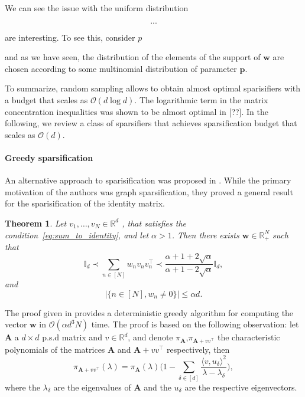 \documentclass[twoside,11pt]{book}
\newtheorem{theorem}{Theorem}
\numberwithin{theorem}{chapter}
\numberwithin{definition}{chapter}
\numberwithin{proposition}{chapter}
\numberwithin{corollary}{chapter}
\numberwithin{example}{chapter}
\numberwithin{lemma}{chapter}
\DeclareMathOperator{\Tran}{\intercal}
\begin{document}
We can see the issue with the uniform distribution 

\begin{equation}
...
\end{equation}

are interesting. To see this, consider $p$

 and as we have seen, the distribution of the elements of the support of $\bm{w}$ are chosen according to some multinomial distribution of parameter $\bm{p}$.

To summarize, random sampling allows to obtain almost optimal sparisifiers with a budget that scales as $\mathcal{O}(d \log d)$. The logarithmic term in the matrix concentration inequalities was shown to be almost optimal in [??]. 
In the following, we review a class of sparsifiers that achieves sparsification budget that scales as $\mathcal{O}(d)$.

\paragraph{Greedy sparsification}
An alternative approach to sparisification was proposed in \citep*{BaSpSr12}. While the primary motivation of the authors was graph sparsification, they proved a general result for the sparisification of the identity matrix.
\begin{theorem}\citep*{BaSpSr12}
Let $v_{1}, \dots, v_{N} \in \mathbb{R}^{d}$ , that satisfies the condition~\eqref{eq:sum_to_identity}, and let $\alpha >1$. Then there exists $\bm{w} \in \mathbb{R}_{+}^{N}$ such that
\begin{equation}
\mathbb{I}_{d} \prec \sum\limits_{n \in [N]}w_{n}v_{n}v_{n}^{\Tran} \prec \frac{\alpha +1 +2\sqrt{\alpha}}{\alpha +1 -2\sqrt{\alpha}} \mathbb{I}_{d},
\end{equation}
and
\begin{equation}
|\{n \in [N], w_{n} \neq 0\}| \leq \alpha d.
\end{equation}
\end{theorem}


The proof given in \citep{BaSpSr12} provides a deterministic greedy algorithm for computing the vector $\bm{w}$ in $\mathcal{O}(\alpha d^{3} N)$ time. The proof is based on the following observation: let $\bm{A}$ a $d\times d$ p.s.d matrix and $v \in \mathbb{R}^{d}$, and denote $\pi_{\bm{A}}$,$\pi_{\bm{A}+vv^{\Tran}}$ the characteristic polynomials of the matrices $\bm{A}$ and $\bm{A}+vv^{\Tran}$ respectively, then 
\begin{equation}
\pi_{\bm{A}+vv^{\Tran}}(\lambda) =  \pi_{\bm{A}}(\lambda) \bigg( 1- \sum\limits_{\delta \in [d]} \frac{\langle v,u_{\delta} \rangle^{2}}{\lambda-\lambda_{\delta}} \bigg), 
\end{equation}
where the $\lambda_{\delta}$ are the eigenvalues of $\bm{A}$ and the $u_{\delta}$ are the respective eigenvectors.
\end{document}
